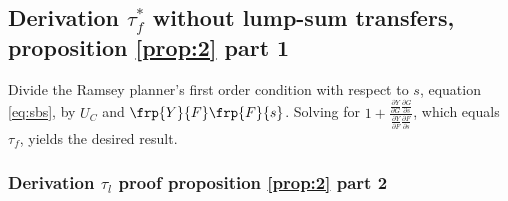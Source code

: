 \subsection{Derivation $\tau_f^*$ without lump-sum transfers, proposition \ref{prop:2} part 1}
	
Divide the Ramsey planner's first order condition with respect to $s$, equation \ref{eq:sbs}, by $U_C$ and $\frp{Y}{F}\frp{F}{s}$. Solving for $1+\frac{\frac{\partial Y}{\partial G}\frac{\partial G}{\partial s}}{\frac{\partial Y}{\partial F}\frac{\partial F}{\partial s}}$, which equals $\tau_f$, yields the desired result. 


\subsubsection{Derivation $\tau_l$ proof proposition \ref{prop:2} part 2}\label{app:subsub_nltaul}

